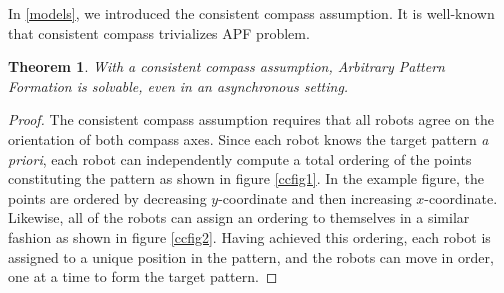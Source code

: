\documentclass[preprint,10pt]{elsarticle}
\newtheorem{theorem}{Theorem}
\begin{document}
	In \ref{models}, we introduced the consistent compass assumption. It is well-known that consistent compass 
	trivializes APF problem. 
	\begin{theorem} 
		With a consistent compass assumption, Arbitrary Pattern Formation is solvable, even in an asynchronous setting.
		\cite{flocchini08arbitrary}
	\end{theorem} 
	\begin{proof}
		The consistent compass assumption requires that all robots agree on the orientation of both compass
		axes. Since each robot knows the target pattern \textit{a priori}, each robot can independently compute
		a total ordering of the points constituting the pattern as shown in figure \ref{ccfig1}. In the example figure,
		the points are ordered by decreasing $y$-coordinate and then increasing $x$-coordinate. Likewise, 
		all of the robots can assign an ordering to themselves in a similar fashion as shown in figure \ref{ccfig2}.
		Having achieved this ordering, each robot is assigned to a unique position in the pattern, and the robots
		can move in order, one at a time to form the target pattern.
	\end{proof}
	
\end{document}

